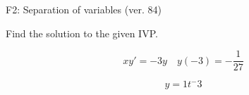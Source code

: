 \begin{exercise}
  \begin{exerciseTitle}F2: Separation of variables (ver. 84)\end{exerciseTitle}
  \begin{exerciseStatement}
    
Find the solution to the given IVP.

    
\[xy'= -3 y \hspace{1em} y( -3 ) = -\frac{1}{27}\]

  \end{exerciseStatement}
  \begin{exerciseAnswer}
    
\[y= 1 t^ -3\]

  \end{exerciseAnswer}
\end{exercise}